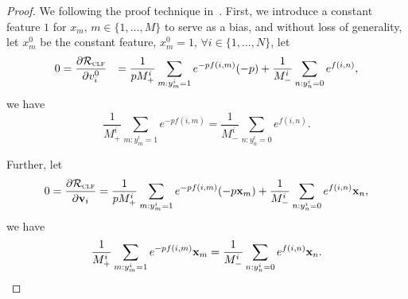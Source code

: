 \begin{proof}
We following the proof technique in~\cite{}.
First, we introduce a constant feature $1$ for $x_m, \, m \in \{1,\dots,M\}$ to serve as a bias, 
and without loss of generality, let $x_m^0$ be the constant feature, \ie $x_m^0 = 1$, 
$\forall i \in \{1,\dots,N\}$, let
\begin{equation*}
\begin{aligned}
0 
&= \frac{\partial \mathcal{R}_\textsc{clf}} {\partial v_i^0}
&= \frac{1}{p M_+^i} \sum_{m: y_m^i = 1} e^{-p f(i, m)} (-p) + \frac{1}{M_-^i} \sum_{n: y_n^i = 0} e^{f(i, n)},
\end{aligned}
\end{equation*}
we have
\begin{equation}
\label{eq:eq1}
\frac{1}{M_+^i} \sum_{m: y_m^i = 1} e^{-p f(i, m)} = \frac{1}{M_-^i} \sum_{n: y_n^i = 0} e^{f(i, n)}.
\end{equation}

Further, let
\begin{equation*}
0 
= \frac{\partial \mathcal{R}_\textsc{clf}} {\partial \mathbf{v}_i} 
= \frac{1}{p M_+^i} \sum_{m: y_m^i = 1} e^{-p f(i, m)} (-p \mathbf{x}_m) + \frac{1}{M_-^i} \sum_{n: y_n^i = 0} e^{f(i, n)} \mathbf{x}_n,
\end{equation*}
we have
\begin{equation}
\label{eq:eq2}
\frac{1}{M_+^i} \sum_{m: y_m^i = 1} e^{-p f(i, m)} \mathbf{x}_m = \frac{1}{M_-^i} \sum_{n: y_n^i = 0} e^{f(i, n)} \mathbf{x}_n.
\end{equation}


\end{proof}
